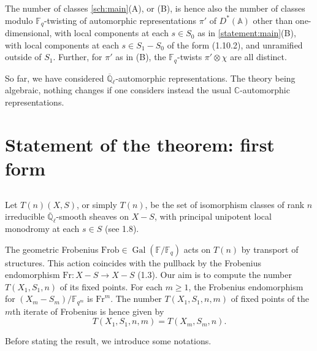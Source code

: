 \documentclass[11pt,a4paper]{article}
\theoremstyle{plain}
\theoremstyle{definition}
\DeclareMathOperator{\Gal}{Gal}
\newcommand{\Ql}{\overline{\mathbb{Q}}_\ell}
\newcommand{\Fq}{\mathbb{F}_q}
\newcommand{\F}{\mathbb{F}}
\newcommand{\C}{\mathbb{C}}
\newcommand{\Frob}{\mathrm{Frob}}
\newcommand{\Fr}{\mathrm{Fr}}
\begin{document}
The number of classes \ref{sch:main}(A), or (B), is hence also the number of classes modulo $\Fq$-twisting of automorphic representations $\pi'$ of $D^*(\mathbb{A})$ other than one-dimensional, with local components at each $s \in S_0$ as in \ref{statement:main}(B), with local components at each $s \in S_1 - S_0$ of the form (1.10.2), and unramified outside of $S_1$. Further, for $\pi'$ as in (B), the $\Fq$-twists $\pi' \otimes \chi$ are all distinct.

So far, we have considered $\Ql$-automorphic representations. The theory being algebraic, nothing changes if one considers instead the usual $\C$-automorphic representations.

\section{Statement of the theorem: first form}

\subsection{}
Let $T(n)(X,S)$, or simply $T(n)$, be the set of isomorphism classes of rank $n$ irreducible $\Ql$-smooth sheaves on $X - S$, with principal unipotent local monodromy at each $s \in S$ (see 1.8).

The geometric Frobenius $\Frob \in \Gal(\F/\Fq)$ acts on $T(n)$ by transport of structures. This action coincides with the pullback by the Frobenius endomorphism $\Fr: X - S \to X - S$ (1.3). Our aim is to compute the number $T(X_1,S_1,n)$ of its fixed points. For each $m \geq 1$, the Frobenius endomorphism for $(X_m - S_m)/\F_{q^m}$ is $\Fr^m$. The number $T(X_1,S_1,n,m)$ of fixed points of the $m$th iterate of Frobenius is hence given by
\begin{equation}
T(X_1,S_1,n,m) = T(X_m,S_m,n). \tag{2.1.1}
\end{equation}

Before stating the result, we introduce some notations.

\subsection{}
\end{document}
